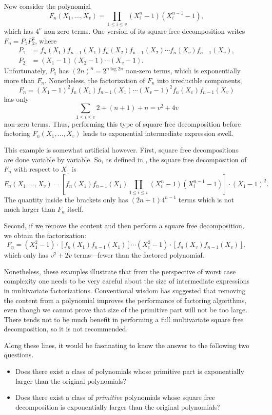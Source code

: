 Now consider the polynomial
\[
F_n(X_1, \ldots, X_v) = \prod_{1 \le i \le v} (X_i^n - 1)(X_i^{n-1} -
1),
\]
which has $4^v$ non-zero terms.  One version of its square free
decomposition writes $F_n = P_1 P_2^2$, where
\[
\begin{aligned}
P_1 & = f_n(X_1) f_{n-1}(X_1 ) f_n(X_2) f_{n-1}(X_2)  \cdots f_n(X_v)
f_{n-1}(X_v),\\
P_2 & = (X_1 - 1) (X_2 - 1) \cdots (X_v - 1).
\end{aligned}
\]
Unfortunately, $P_1$ has $(2n)^n = 2^{n \log 2n}$ non-zero terms, which
is exponentially more than $F_n$.  Nonetheless, the factorization of
$F_n$ into irreducible components,
\[
F_n = (X_1 - 1)^2 f_n(X_1) f_{n-1}(X_1) \cdots  (X_v - 1)^2 f_n(X_v)
f_{n-1}(X_v)
\]
 has only
\[
\sum_{1\le i \le v} 2 + (n+1) + n = v^2 + 4v
\]
non-zero terms.  Thus, performing this type of square free
decomposition before factoring $F_n(X_1, \ldots, X_v)$ leads to
exponential intermediate expression swell.

\medskip
This example is somewhat artificial however.  First, square free
decompositions are done variable by variable.  So, as defined in
, the square free decomposition of $F_n$ with respect to
$X_1$ is
\[
F_n(X_1, \ldots, X_v) 
  = \left[f_n(X_1) f_{n-1}(X_1) \prod_{1\le i\le v}(X_i^n - 1)
(X_i^{n-1} - 1)\right] \cdot (X_1 - 1)^2.
\]
The quantity inside the brackets only has $(2n+1)4^{n-1}$ terms which
is not much larger than $F_n$ itself.

Second, if we remove the content and then perform a square free
decomposition, we obtain the factorization:
\[
F_n
  = (X_1^2 - 1)\cdot \left[f_n(X_1) f_{n-1}(X_1)\right] \cdots
    (X_v^2 - 1)\cdot \left[f_n(X_v) f_{n-1}(X_v)\right],
\]
which only has $v^2 + 2v$ terms---fewer than the factored polynomial.

Nonetheless, these examples illustrate that from the perspective of
worst case complexity one needs to be very careful about the size of
intermediate expressions in multivariate factorizations.  Conventional
wisdom has suggested that removing the content from a polynomial
improves the performance of factoring algorithms, even though we
cannot prove that size of the primitive part will not be too large.  There tends not to be much benefit
in performing a full multivariate square free decomposition, so it is
not recommended.

Along these lines, it would be fascinating to know the answer to the
following two questions.
\begin{itemize}
\item Does there exist a class of polynomials whose primitive part is
exponentially larger than the original polynomials?
\item Does there exist a class of {\em primitive} polynomials whose
square free decomposition is exponentially larger than the original
polynomials?
\end{itemize}


